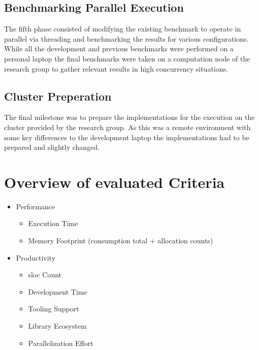 \subsection*{Benchmarking Parallel Execution}
\label{subsec:Concept::Implementation::ParallelBenchmark}

The fifth phase consisted of modifying the existing benchmark to operate in parallel via threading and benchmarking the results for various configurations. While all the development and previous benchmarks were performed on a personal laptop the final benchmarks were taken on a computation node of the research group to gather relevant results in high concurrency situations.

\subsection*{Cluster Preperation}
\label{subsec:Concept::Implementation::ClusterPreparation}

The final milestone was to prepare the implementations for the execution on the cluster provided by the research group. As this was a remote environment with some key differences to the development laptop the implementations had to be prepared and slightly changed.

\section{Overview of evaluated Criteria}
\label{sec:Concept::Criteria}

\begin{itemize}
    \item Performance
    \begin{itemize}
        \item Execution Time
        \item Memory Footprint (consumption total + allocation counts)
    \end{itemize}
    \item Productivity
    \begin{itemize}
        \item \acrshort{sloc} Count
        \item Development Time
        \item Tooling Support
        \item Library Ecosystem
        \item Parallelization Effort
    \end{itemize}
\end{itemize}

